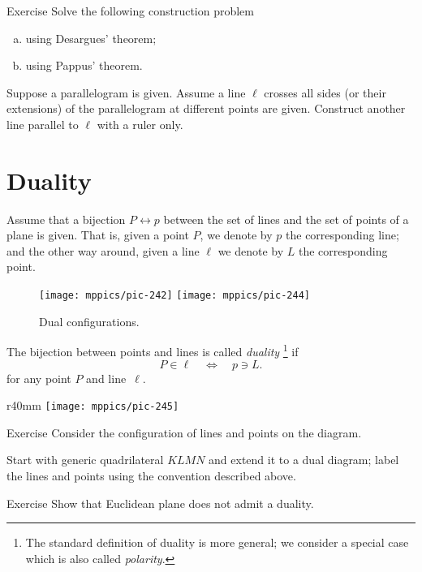 \begin{thm}{Exercise}\label{ex:desargues-construction}
Solve the following construction problem
\begin{enumerate}[(a)]
\item\label{ex:desargues-construction:desargues} using Desargues' theorem;
\item\label{ex:desargues-construction:pappus} using Pappus' theorem.
\end{enumerate}
Suppose a parallelogram is given.
Assume a line $\ell$ crosses all sides (or their extensions) of the parallelogram at different points are given. 
Construct another line parallel to $\ell$ with a ruler only.
\end{thm}


\section*{Duality}



Assume that a bijection $P\leftrightarrow p$ between the set of lines and the set of points of a plane is given.
That is,
given a point $P$, we denote by $p$ the corresponding line;
and the other way around, 
given a line $\ell$ we denote by $L$ the corresponding point. 

\begin{figure}[h!]
\centering
\texttt{[image: mppics/pic-242]}
\hskip15mm
\texttt{[image: mppics/pic-244]}
\caption*{Dual configurations.}
\end{figure}

The bijection between points and lines is called \emph{duality}\label{page:duality}%
\footnote{The standard definition of duality is more general; we consider a special case which is also called \emph{polarity}.}
if 
\[P\in \ell
\quad
\iff
\quad 
p\ni L.\]
for any point $P$ and line~$\ell$.

{

\begin{wrapfigure}{r}{40mm}
\vskip-4mm
\centering
\texttt{[image: mppics/pic-245]}
\end{wrapfigure}

\begin{thm}{Exercise}\label{ex:dual-configurations}
Consider the configuration of lines and points on the diagram.

Start with generic quadrilateral $KLMN$ and extend it to a dual diagram; label the lines and points using the convention described above.
\end{thm}

\begin{thm}{Exercise}\label{ex:dual-euclid}
Show that Euclidean plane does not admit a duality. 
\end{thm}

}

